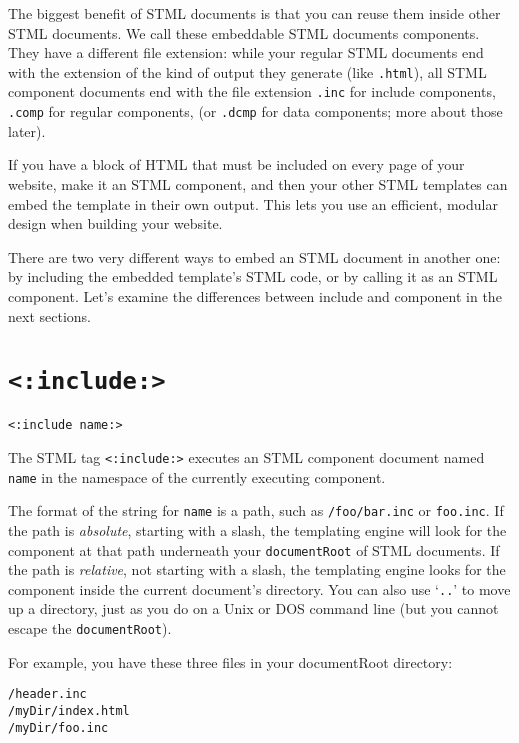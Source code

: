 \documentclass{manual}
\begin{document}
The biggest benefit of STML documents is that you can 
reuse them inside other STML documents. We call these
embeddable STML documents components. They have a different
file extension: while your regular STML documents end with
the extension of the kind of output they generate (like
\texttt{.html}), all STML component documents end with the file
extension
\texttt{.inc} for include components, \texttt{.comp} for 
regular components, (or \texttt{.dcmp} for data components; more about
those later).

If you have a block of HTML that must be included on 
every page of your website, make it an STML component, 
and then your other STML templates can embed the template 
in their own output. This lets you use an efficient, modular 
design when building your website.

There are two very different ways to embed an STML document 
in another one: by including the embedded template's STML code, 
or by calling it as an STML component. Let's examine the 
differences between include and component in the next sections.


\section{\texttt{<:include:>}}
\label{taginclude}

\begin{verbatim}<:include name:>\end{verbatim}

The STML tag \texttt{<:include:>} executes an
STML component document named \texttt{name}
in the namespace of the currently executing component.

The format of the string for \texttt{name} is a path, such as
\texttt{/foo/bar.inc} or \texttt{foo.inc}. If the path is
\emph{absolute}, starting with a slash, the templating engine will
look for the component at that path underneath your
\texttt{documentRoot} of STML documents. If the path is
\emph{relative}, not starting with a slash, the templating engine
looks for the component inside the current document's directory. You
can also use `\texttt{..}' to move up a directory, just as you do on a
Unix or DOS command line (but you cannot escape the
\texttt{documentRoot}).

For example, you have these three files in your 
documentRoot directory:

\begin{verbatim}/header.inc
/myDir/index.html
/myDir/foo.inc
\end{verbatim}
\end{document}
